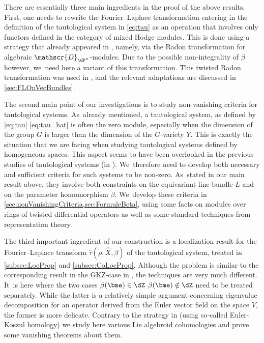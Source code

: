 There are essentially three main ingredients in the proof of the above results. First, one needs to rewrite the
Fourier--Laplace transformation entering in the definition of the tautological system in \eqref{eq:tau} as an operation that involves only functors defined in the category of mixed Hodge modules. This is done using a strategy that already appeared in \cite{Reich2}, namely, via the Radon transformation for algebraic $\mathscr{D}_{\dP^n}$\nobreakdash-mod\-ules.
Due to the possible non-integrality of $\beta$ however, we~need here a variant of this transformation.
This twisted Radon transformation was used in \cite[\S 5.2]{RS20}, and the relevant adaptations are discussed in \cref{sec:FLOnVecBundles}.

The second main point of our investigations is to study non-vanishing criteria for tautological systems. As~already mentioned, a tautological system, as defined by \eqref{eq:tau} \resp \eqref{eq:tau_hat} is often the zero module, especially when the dimension of the group $G$ is larger than the dimension of the $G$-variety $Y$. This is exactly the situation that we are facing when studying tautological systems defined by homogeneous spaces. This aspect seems to have been overlooked in the previous studies of tautological systems (\eg in \cite{Bloch_HolRankProb,HuangLianZhu}). We~therefore need to develop both necessary and sufficient criteria for such systems to be non-zero. As~stated in our main result above, they involve both constraints on the equivariant line bundle $L$ and on the parameter homomorphism $\beta$. We~develop these criteria in \cref{sec:nonVanishingCriteria,sec:FormuleBeta}, using some facts on modules over rings of twisted differential operators as well as some standard techniques from representation theory.

The third important ingredient of our construction is a localization result for the Fourier--Laplace transform $\hat{\tau}(\rho,\hat{X},\beta)$ of the tautological system, treated in \cref{subsec:LocProp} and \cref{subsec:CoLocProp}. Although the problem is similar to the corresponding result in the GKZ-case in \cite{SW09}, the techniques are very much different. It~is here where the two cases
$\beta(\bme)\in\dZ$ \resp $\beta(\bme)\notin\dZ$
need to be treated separately. While the latter is a relatively simple argument concerning eigenvalue decomposition for an operator derived from the Euler vector field on the space $V$, the former is more delicate. Contrary to the strategy in \cite{SW09} (using so-called Euler-Koszul homology) we study here various Lie algebroid cohomologies and prove some vanishing theorems about them.

